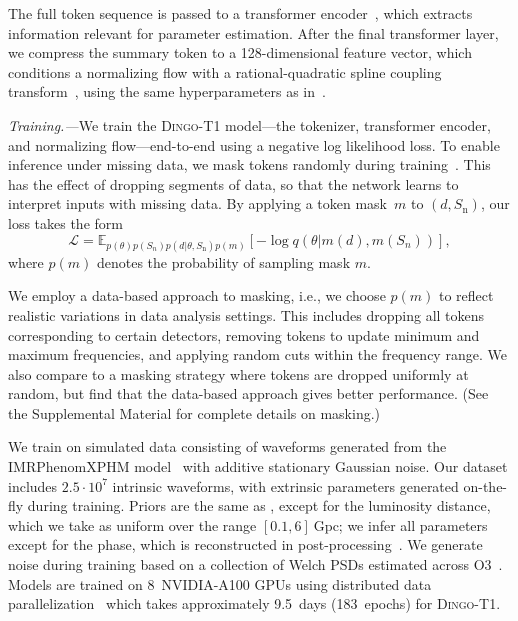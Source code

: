 \documentclass[aps,prl,twocolumn,nofootinbib,longbibliography,amsfonts,amssymb,amsmath,superscriptaddress]{revtex4-2}
\newcommand{\dingoT}{\mbox{\textsc{Dingo-T1}}\xspace}
\renewcommand{\sec}[1]{\emph{#1.---}}
\begin{document}
The full token sequence is passed to a transformer encoder~\citep{vaswani:2017, wang:2019, xiong:2020}, which extracts information relevant for parameter estimation. After the final transformer layer, we compress the summary token to a 128-dimensional feature vector, which conditions a normalizing flow with a rational-quadratic spline coupling transform~\citep{durkan_nsf:2019}, using the same hyperparameters as in~\citep{dax_is:2022}.

\sec{Training}We train the \dingoT model---the tokenizer, transformer encoder, and normalizing flow---end-to-end using a negative log likelihood loss. 
To enable inference under missing data, we mask tokens randomly during training~\citep{cheng_mask2former:2021}. 
This has the effect of dropping segments of data, so that the network learns to interpret inputs with missing data. %
By applying a token mask~$m$ %
to $(d, S_\mathrm{n})$, our loss takes the form
\begin{equation}
    \mathcal{L} =  \mathbb{E}_{p(\theta)p(S_n)p(d|\theta, S_\mathrm{n})p(m)}\left[ - \log q\left(\theta| m(d), m(S_n)\right)\right],
\end{equation}
where $p(m)$ denotes the probability of sampling mask $m$.

We employ a data-based approach to masking, i.e., we choose $p(m)$ to reflect realistic variations in data analysis settings. 
This includes dropping all tokens corresponding to certain detectors, removing tokens to update minimum and maximum frequencies, and applying random cuts within the frequency range. 
We also compare to a masking strategy where tokens are dropped uniformly at random, but find that the data-based approach gives better performance. (See the Supplemental Material for complete details on masking.)

We train on simulated data consisting of waveforms generated from the IMRPhenomXPHM model~\citep{pratten_imrphenomxphm:2021} with additive stationary Gaussian noise. 
Our dataset includes $2.5\cdot 10^7$ intrinsic waveforms, with extrinsic parameters generated on-the-fly during training. 
Priors are the same as \citep{dax_is:2022}, except for the luminosity distance, which we take as uniform over the range $[0.1, 6]~\mathrm{Gpc}$; we infer all parameters except for the phase, which is reconstructed in post-processing~\cite{dax_dingo:2021}. 
We generate noise during training based on a collection of Welch PSDs estimated across O3~\citep{dax_dingo:2021}. 
Models are trained on 8~NVIDIA-A100 GPUs using distributed data parallelization~\citep{loshchilov_adamw:2018, micikevicius_amp:2018} which takes approximately 9.5~days (183~epochs) for \dingoT.
\end{document}
